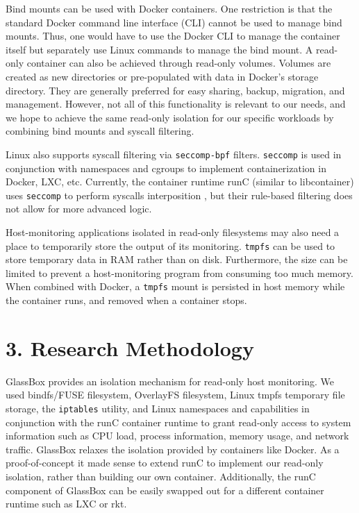 \documentclass{proc}
\begin{document}
Bind mounts can be used with Docker containers. One restriction is that the standard Docker command line interface (CLI) cannot be used to manage bind mounts. Thus, one would have to use the Docker CLI to manage the container itself but separately use Linux commands to manage the bind mount. A read-only container can also be achieved through read-only volumes. Volumes are created as new directories or pre-populated with data in Docker's storage directory. They are generally preferred for easy sharing, backup, migration, and management. However, not all of this functionality is relevant to our needs, and we hope to achieve the same read-only isolation for our specific workloads by combining bind mounts and syscall filtering.

Linux also supports syscall filtering via \texttt{seccomp-bpf} filters. \texttt{seccomp} is used in conjunction with namespaces and cgroups to implement containerization in Docker, LXC, etc. Currently, the container runtime runC (similar to libcontainer) uses \texttt{seccomp} to perform syscalls interposition \cite{opencontainerinitiative}, but their rule-based filtering does not allow for more advanced logic.

Host-monitoring applications isolated in read-only filesystems may also need a place to temporarily store the output of its monitoring. \texttt{tmpfs} can be used to store temporary data in RAM rather than on disk. Furthermore, the size can be limited to prevent a host-monitoring program from consuming too much memory. When combined with Docker, a \texttt{tmpfs} mount is persisted in host memory while the container runs, and removed when a container stops.

\section*{3. Research Methodology}

GlassBox provides an isolation mechanism for read-only host monitoring. We used bindfs/FUSE filesystem, OverlayFS filesystem, Linux tmpfs temporary file storage, the \texttt{iptables} utility, and Linux namespaces and capabilities in conjunction with the runC container runtime to grant read-only access to system information such as CPU load, process information, memory usage, and network traffic. GlassBox relaxes the isolation provided by containers like Docker. As a proof-of-concept it made sense to extend runC to implement our read-only isolation, rather than building our own container. Additionally, the runC component of GlassBox can be easily swapped out for a different container runtime such as LXC or rkt. 
\end{document}
